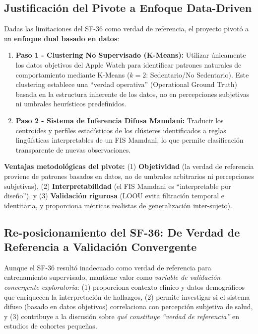 \subsection{Justificación del Pivote a Enfoque Data-Driven}
\label{subsec:justificacion_pivote}

Dadas las limitaciones del SF-36 como verdad de referencia, el proyecto pivotó a un \textbf{enfoque dual basado en datos}:

\begin{enumerate}
    \item \textbf{Paso 1 - Clustering No Supervisado (K-Means):} Utilizar únicamente los datos objetivos del Apple Watch para identificar patrones naturales de comportamiento mediante K-Means ($k=2$: Sedentario/No Sedentario). Este clustering establece una ``verdad operativa'' (Operational Ground Truth) basada en la estructura inherente de los datos, no en percepciones subjetivas ni umbrales heurísticos predefinidos.
    
    \item \textbf{Paso 2 - Sistema de Inferencia Difusa Mamdani:} Traducir los centroides y perfiles estadísticos de los clústeres identificados a reglas lingüísticas interpretables de un FIS Mamdani, lo que permite clasificación transparente de nuevas observaciones.
\end{enumerate}

\textbf{Ventajas metodológicas del pivote:} (1) \textbf{Objetividad} (la verdad de referencia proviene de patrones basados en datos, no de umbrales arbitrarios ni percepciones subjetivas), (2) \textbf{Interpretabilidad} (el FIS Mamdani es ``interpretable por diseño''), y (3) \textbf{Validación rigurosa} (LOOU evita filtración temporal e identitaria, y proporciona métricas realistas de generalización inter-sujeto).

\subsection{Re-posicionamiento del SF-36: De Verdad de Referencia a Validación Convergente}
\label{subsec:reposicionamiento_sf36}

Aunque el SF-36 resultó inadecuado como verdad de referencia para entrenamiento supervisado, mantiene valor como \textit{variable de validación convergente exploratoria}: (1) proporciona contexto clínico y datos demográficos que enriquecen la interpretación de hallazgos, (2) permite investigar si el sistema difuso (basado en datos objetivos) correlaciona con percepción subjetiva de salud, y (3) contribuye a la discusión sobre \textit{qué constituye ``verdad de referencia''} en estudios de cohortes pequeñas.

